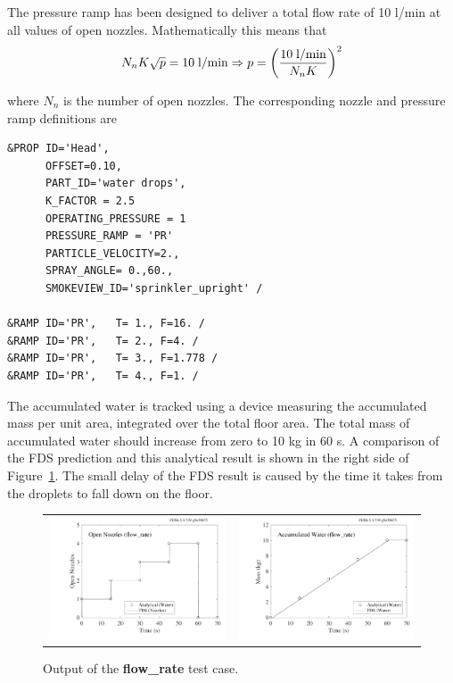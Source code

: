 \documentclass[11pt]{book}
\newcommand{\be}{\begin{equation}}
\newcommand{\ee}{\end{equation}}
\begin{document}
The pressure ramp has been designed to deliver a total flow rate of 10 l/min at all values of open nozzles. Mathematically this means that
\be
N_n K \sqrt{p} = 10 \;\hbox{l/min} \Rightarrow
p = \left( \frac{10 \;\hbox{l/min}}{N_n K}\right)^2
\ee

\noindent
where $N_n$ is the number of open nozzles. The corresponding nozzle and pressure ramp definitions are
\footnotesize
\begin{verbatim}
&PROP ID='Head',
      OFFSET=0.10,
      PART_ID='water drops',
      K_FACTOR = 2.5
      OPERATING_PRESSURE = 1
      PRESSURE_RAMP = 'PR'
      PARTICLE_VELOCITY=2.,
      SPRAY_ANGLE= 0.,60.,
      SMOKEVIEW_ID='sprinkler_upright' /

&RAMP ID='PR',   T= 1., F=16. /
&RAMP ID='PR',   T= 2., F=4. /
&RAMP ID='PR',   T= 3., F=1.778 /
&RAMP ID='PR',   T= 4., F=1. /
\end{verbatim}
\normalsize

The accumulated water is tracked using a device measuring the accumulated mass per unit area, integrated over the total floor area. The total mass of accumulated water should increase from zero to 10 kg in 60 s. A comparison of the FDS prediction and this analytical result is shown in the right side of Figure~\ref{flow_rate}. The small delay of the FDS result is caused by the time it takes from the droplets to fall down on the floor.

\begin{figure}[ht]
\begin{tabular*}{\textwidth}{lr}
\includegraphics[width=3.2in]{SCRIPT_FIGURES/flow_rate_open_nozzles} &
\includegraphics[width=3.2in]{SCRIPT_FIGURES/flow_rate_water_mass}
\end{tabular*}
\caption[Output of the flow rate test case.]{Output of the {\bf flow\_rate} test case.}
\label{flow_rate}
\end{figure}
\end{document}
